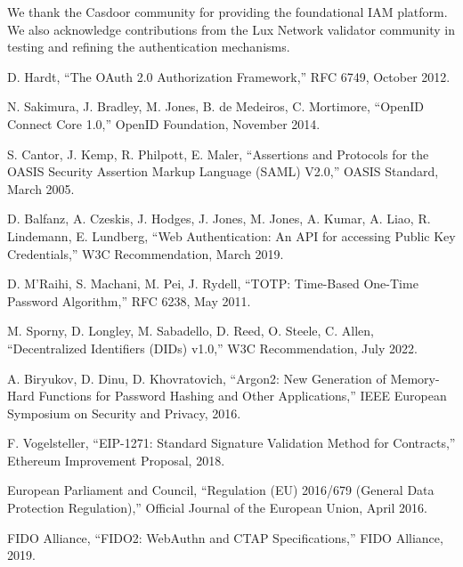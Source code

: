 \documentclass[11pt,a4paper]{article}
\begin{document}
We thank the Casdoor community for providing the foundational IAM platform. We also acknowledge contributions from the Lux Network validator community in testing and refining the authentication mechanisms.

\begin{thebibliography}{99}

D. Hardt, ``The OAuth 2.0 Authorization Framework,'' RFC 6749, October 2012.

N. Sakimura, J. Bradley, M. Jones, B. de Medeiros, C. Mortimore, ``OpenID Connect Core 1.0,'' OpenID Foundation, November 2014.

S. Cantor, J. Kemp, R. Philpott, E. Maler, ``Assertions and Protocols for the OASIS Security Assertion Markup Language (SAML) V2.0,'' OASIS Standard, March 2005.

D. Balfanz, A. Czeskis, J. Hodges, J. Jones, M. Jones, A. Kumar, A. Liao, R. Lindemann, E. Lundberg, ``Web Authentication: An API for accessing Public Key Credentials,'' W3C Recommendation, March 2019.

D. M'Raihi, S. Machani, M. Pei, J. Rydell, ``TOTP: Time-Based One-Time Password Algorithm,'' RFC 6238, May 2011.

M. Sporny, D. Longley, M. Sabadello, D. Reed, O. Steele, C. Allen, ``Decentralized Identifiers (DIDs) v1.0,'' W3C Recommendation, July 2022.

A. Biryukov, D. Dinu, D. Khovratovich, ``Argon2: New Generation of Memory-Hard Functions for Password Hashing and Other Applications,'' IEEE European Symposium on Security and Privacy, 2016.

F. Vogelsteller, ``EIP-1271: Standard Signature Validation Method for Contracts,'' Ethereum Improvement Proposal, 2018.

European Parliament and Council, ``Regulation (EU) 2016/679 (General Data Protection Regulation),'' Official Journal of the European Union, April 2016.

FIDO Alliance, ``FIDO2: WebAuthn and CTAP Specifications,'' FIDO Alliance, 2019.

\end{thebibliography}
\end{document}
